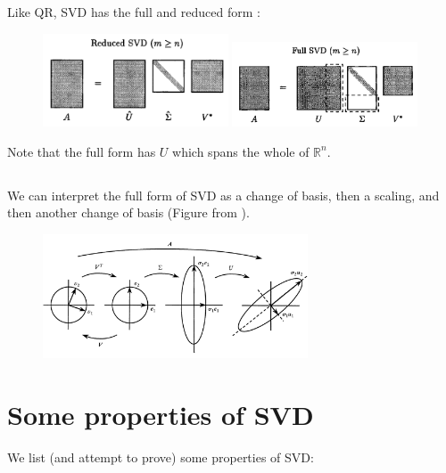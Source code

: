 \documentclass[11pt,letterpaper]{report}
\begin{document}
\subsection{}
Like QR, SVD has the full and reduced form \cite{TrefethenBau_97}:
\begin{figure}[H]
    \centering
    \includegraphics[width = 0.49\textwidth]{Session_10/latex/figs/TB_reducedSVD}
    \includegraphics[width = 0.49\textwidth]{Session_10/latex/figs/TB_fullSVD}
\end{figure}
Note that the full form has $U$ which spans the whole of $\mathbb{R}^n$.

\subsection{}
We can interpret the full form of SVD as a change of basis, then a scaling, and then another change of basis (Figure from \cite{Strang_93}).
\begin{figure}[H]
    \centering
    \includegraphics[width = 0.7\textwidth]{Session_10/latex/figs/strang_SVD}
\end{figure}

\section{Some properties of SVD}
We list (and attempt to prove) some properties of SVD:
\end{document}
